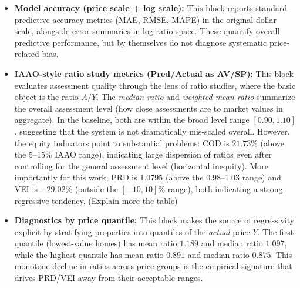 \documentclass[11pt]{article}
\theoremstyle{plain}
\theoremstyle{definition}
\newcommand{\1}{\mathbf{1}}
\newcommand{\red}[1]{{\color{red} #1}}
\begin{document}
\begin{itemize}
    \item \textbf{Model accuracy (price scale + log scale):} This block reports standard predictive accuracy metrics (MAE, RMSE, MAPE) in the original dollar scale, alongside error summaries in log-ratio space. These quantify overall predictive performance, but by themselves do not diagnose systematic price-related bias.

    \item \textbf{IAAO-style ratio study metrics (Pred/Actual as AV/SP):} This block evaluates assessment quality through the lens of ratio studies, where the basic object is the ratio $A/Y$. The \emph{median ratio} and \emph{weighted mean ratio} summarize the overall assessment level (how close assessments are to market values in aggregate). In the baseline, both are within the broad level range $[0.90,1.10]$, suggesting that the system is not dramatically mis-scaled overall. However, the equity indicators point to substantial problems: COD is $21.73\%$ (above the 5--15\% IAAO range), indicating large dispersion of ratios even after controlling for the general assessment level (horizontal inequity). More importantly for this work, PRD is $1.0795$ (above the 0.98--1.03 range) and VEI is $-29.02\%$ (outside the $[-10,10]\%$ range), both indicating a strong regressive tendency. \red{(Explain more the table)}

    \item \textbf{Diagnostics by price quantile:} This block makes the source of regressivity explicit by stratifying properties into quantiles of the \emph{actual} price $Y$. The first quantile (lowest-value homes) has mean ratio $1.189$ and median ratio $1.097$, while the highest quantile has mean ratio $0.891$ and median ratio $0.875$. This monotone decline in ratios across price groups is the empirical signature that drives PRD/VEI away from their acceptable ranges.
\end{itemize}


\end{document}

